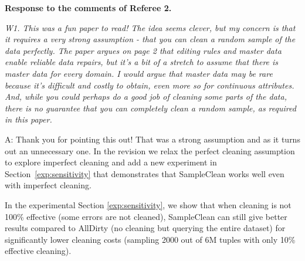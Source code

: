 

\vspace{1em}


{\noindent \bf Response to the comments of Referee 2.}

\vspace{1em}

\emph{W1. This was a fun paper to read! The idea seems clever, but my concern is that it requires a very strong assumption - that you can clean a random sample of the data perfectly. The paper argues on page 2 that editing rules and master data enable reliable data repairs, but it's a bit of a stretch to assume that there is master data for every domain. I would argue that master data may be rare because it's difficult and costly to obtain, even more so for continuous attributes. And, while you could perhaps do a good job of cleaning some parts of the data, there is no guarantee that you can completely clean a random sample, as required in this paper.}




A: Thank you for pointing this out!  That was a strong assumption and as it turns out an unnecessary one.  In the revision we relax the perfect cleaning assumption to explore imperfect cleaning and add a new experiment in Section~\ref{exp:sensitivity} that demonstrates that SampleClean works well even with imperfect cleaning.

In the experimental Section \ref{exp:sensitivity}, we show that when cleaning is not 100\% effective (some errors are not cleaned), SampleClean can still give better results compared to AllDirty (no cleaning but querying the entire dataset) for significantly lower cleaning costs (sampling 2000 out of 6M tuples with only 10\% effective cleaning).

